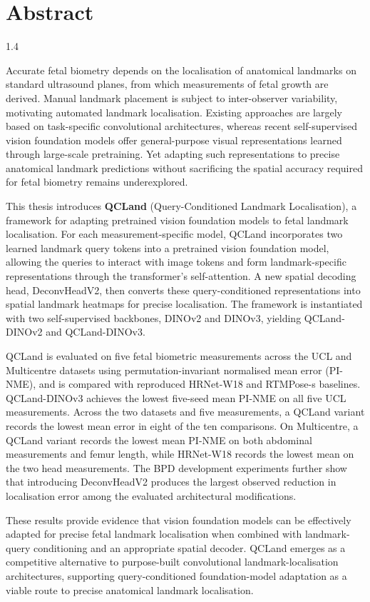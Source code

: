 \chapter*{Abstract}

\begin{spacing}{1.4}

Accurate fetal biometry depends on the localisation of anatomical
landmarks on standard ultrasound planes, from which measurements of
fetal growth are derived. Manual landmark placement is subject to
inter-observer variability, motivating automated landmark localisation.
Existing approaches are largely based on task-specific convolutional
architectures, whereas recent self-supervised vision foundation models
offer general-purpose visual representations learned through
large-scale pretraining. Yet adapting such representations to precise
anatomical landmark predictions without sacrificing the spatial
accuracy required for fetal biometry remains underexplored.

This thesis introduces \textbf{QCLand} (Query-Conditioned Landmark
Localisation), a framework for adapting pretrained vision foundation
models to fetal landmark localisation. For each measurement-specific
model, QCLand incorporates two learned landmark query tokens into a
pretrained vision foundation model, allowing the queries to interact
with image tokens and form landmark-specific representations through
the transformer's self-attention. A new spatial decoding head,
DeconvHeadV2, then converts these query-conditioned representations
into spatial landmark heatmaps for precise localisation. The framework
is instantiated with two self-supervised backbones, DINOv2 and DINOv3,
yielding QCLand-DINOv2 and QCLand-DINOv3.

QCLand is evaluated on five fetal biometric measurements across the
UCL and Multicentre datasets using permutation-invariant normalised
mean error (PI-NME), and is compared with reproduced HRNet-W18 and
RTMPose-s baselines. QCLand-DINOv3 achieves the lowest five-seed mean
PI-NME on all five UCL measurements. Across the two datasets and five
measurements, a QCLand variant records the lowest mean error in eight
of the ten comparisons. On Multicentre, a QCLand variant records the
lowest mean PI-NME on both abdominal measurements and femur length,
while HRNet-W18 records the lowest mean on the two head measurements.
The BPD development experiments further show that introducing
DeconvHeadV2 produces the largest observed reduction in localisation
error among the evaluated architectural modifications.

These results provide evidence that vision foundation models can be
effectively adapted for precise fetal landmark localisation when
combined with landmark-query conditioning and an appropriate spatial
decoder. QCLand emerges as a competitive alternative to purpose-built
convolutional landmark-localisation architectures, supporting
query-conditioned foundation-model adaptation as a viable route to
precise anatomical landmark localisation.

\end{spacing}
